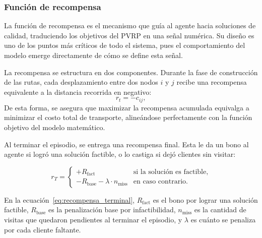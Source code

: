 \subsubsection{Función de recompensa} \label{sec:Funcionderecompensa}
La función de recompensa es el mecanismo que guía al agente hacia soluciones de calidad, traduciendo los objetivos del PVRP en una señal numérica. Su diseño es uno de los puntos más críticos de todo el sistema, pues el comportamiento del modelo emerge directamente de cómo se define esta señal.

La recompensa se estructura en dos componentes. Durante la fase de construcción de las rutas, cada desplazamiento entre dos nodos $i$ y $j$ recibe una recompensa equivalente a la distancia recorrida en negativo:
\begin{equation}
    \label{eq:recompensa_transicion}
    r_t = -c_{ij},
\end{equation}
De esta forma, se asegura que maximizar la recompensa acumulada equivalga a minimizar el costo total de transporte, alineándose perfectamente con la función objetivo del modelo matemático.

Al terminar el episodio, se entrega una recompensa final. Esta le da un bono al agente si logró una solución factible, o lo castiga si dejó clientes sin visitar:

\begin{equation}
    \label{eq:recompensa_terminal}
    r_T =
    \begin{cases}
    +R_{\text{fact}} & \text{si la solución es factible,} \\
    -R_{\text{base}} - \lambda \cdot n_{\text{miss}} & \text{en caso contrario.}
    \end{cases}
\end{equation}

En la ecuación~\eqref{eq:recompensa_terminal}, $R_{\text{fact}}$ es el bono por lograr una solución factible, $R_{\text{base}}$ es la penalización base por infactibilidad, $n_{\text{miss}}$ es la cantidad de visitas que quedaron pendientes al terminar el episodio, y $\lambda$ es cuánto se penaliza por cada cliente faltante.



